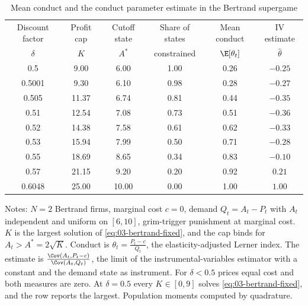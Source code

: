 \begin{table}[htbp]
\centering
\caption{Mean conduct and the conduct parameter estimate in the Bertrand supergame}
\label{tab:03-corts-sim}
\begin{threeparttable}
\begin{tabular}{@{}cccccc@{}}
\toprule
Discount factor & Profit cap & Cutoff state & Share of states & Mean conduct & IV estimate \\
$\delta$ & $K$ & $A^*$ & constrained & $\E[\theta_t]$ & $\hat\theta$ \\
\midrule
0.5 & 9.00 & 6.00 & 1.00 & 0.26 & $-0.25$ \\
0.5001 & 9.30 & 6.10 & 0.98 & 0.28 & $-0.27$ \\
0.505 & 11.37 & 6.74 & 0.81 & 0.44 & $-0.35$ \\
0.51 & 12.54 & 7.08 & 0.73 & 0.51 & $-0.36$ \\
0.52 & 14.38 & 7.58 & 0.61 & 0.62 & $-0.33$ \\
0.53 & 15.94 & 7.99 & 0.50 & 0.71 & $-0.28$ \\
0.55 & 18.69 & 8.65 & 0.34 & 0.83 & $-0.10$ \\
0.57 & 21.15 & 9.20 & 0.20 & 0.92 & $0.21$ \\
0.6048 & 25.00 & 10.00 & 0.00 & 1.00 & $1.00$ \\
\bottomrule
\end{tabular}
\begin{tablenotes}[flushleft]\footnotesize
\item Notes: $N = 2$ Bertrand firms, marginal cost $c = 0$, demand $Q_t = A_t - P_t$ with $A_t$ independent and uniform on
$[6, 10]$, grim-trigger punishment at marginal cost. $K$ is the largest solution of \eqref{eq:03-bertrand-fixed}, and the
cap binds for $A_t > A^* = 2\sqrt K$. Conduct is $\theta_t = \frac{P_t - c}{Q_t}$, the elasticity-adjusted Lerner index.
The estimate is $\frac{\Cov(A_t, P_t - c)}{\Cov(A_t, Q_t)}$, the limit of the instrumental-variables estimator with a
constant and the demand state as instrument. For $\delta < 0.5$ prices equal cost and both measures are zero. At
$\delta = 0.5$ every $K \in [0, 9]$ solves \eqref{eq:03-bertrand-fixed}, and the row reports the largest. Population
moments computed by quadrature.
\end{tablenotes}
\end{threeparttable}
\end{table}

